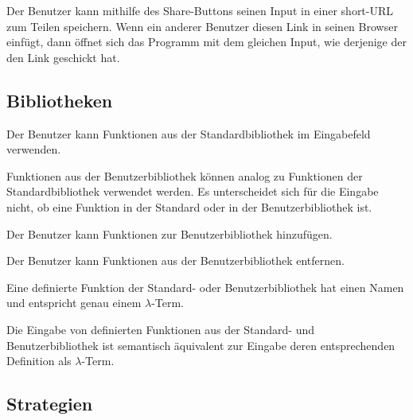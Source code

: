 \documentclass[parskip=full,11pt,twoside]{scrartcl}
\begin{document}
Der Benutzer kann mithilfe des Share-Buttons seinen Input in einer short-URL zum Teilen speichern. Wenn ein anderer Benutzer diesen Link in seinen Browser einfügt, dann öffnet sich das Programm mit dem gleichen Input, wie derjenige der den Link geschickt hat.



\subsection{Bibliotheken}

Der Benutzer kann Funktionen aus der Standardbibliothek im Eingabefeld verwenden.

Funktionen aus der Benutzerbibliothek können analog zu Funktionen der Standardbibliothek verwendet werden. Es unterscheidet sich für die Eingabe nicht, ob eine Funktion in der Standard oder in der Benutzerbibliothek ist.

Der Benutzer kann Funktionen zur Benutzerbibliothek hinzufügen.

Der Benutzer kann Funktionen aus der Benutzerbibliothek entfernen.

Eine definierte Funktion der Standard- oder Benutzerbibliothek hat einen Namen und entspricht genau einem $\lambda$-Term.

Die Eingabe von definierten Funktionen aus der Standard- und Benutzerbibliothek ist semantisch äquivalent zur Eingabe deren entsprechenden Definition als $\lambda$-Term.









\subsection{Strategien}
\end{document}
